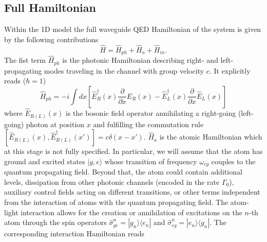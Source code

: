 \documentclass[pra,twocolumn,showpacs,preprintnumbers,amsmath,amssymb]{revtex4-1}
\begin{document}
\subsection{Full Hamiltonian}
 Within the 1D model the full waveguide QED Hamiltonian of the system is given by the following contributions 
\begin{equation}\label{H_tot}
\hat H=\hat H_{ph}+ \hat H_a+\hat H_{in}.
\end{equation}
The fist term $\hat H_{ph}$ is the photonic Hamiltonian describing right- and left-propagating modes traveling in the channel with group velocity $c$.
It explicitly reads  ($\hbar=1$) 
\begin{equation}\label{H_ph}
\hat H_{ph}=-i\int dx\left[\hat E_R^{\dagger}(x)\frac{\partial}{\partial x}\hat E_R(x)-\hat E_L^{\dagger}(x)\frac{\partial}{\partial x}\hat E_L(x)\right]
\end{equation}
where $\hat E_{R(L)}(x)$ is the bosonic field operator annihilating a right-going (left-going) photon at position $x$ and fulfilling the commutation rule  $[\hat E_{R(L)}(x),\hat E^{\dagger}_{R(L)}(x')]=c\delta(x-x')$. %
$\hat H_a$ is the atomic Hamiltonian which at this stage is not fully specified. In particular, we will assume that the atom has ground and excited states $|g,e\rangle$ whose transition of frequency $\omega_{eg}$ couples to the quantum propagating field. Beyond that, the atom could contain additional levels, dissipation from other photonic channels (encoded in the rate $\Gamma_0$),  auxiliary control fields acting on different transitions, or other terms independent from the interaction of atoms with the quantum propagating field. The atom-light interaction allows for the creation or annihilation of excitations on the $n$-th atom through the spin operators $\hat\sigma^n_{ge}=|g_n\rangle\langle e_n|$ and $\hat\sigma^n_{eg}=|e_n\rangle\langle g_n|$. The corresponding interaction Hamiltonian reads
\end{document}
